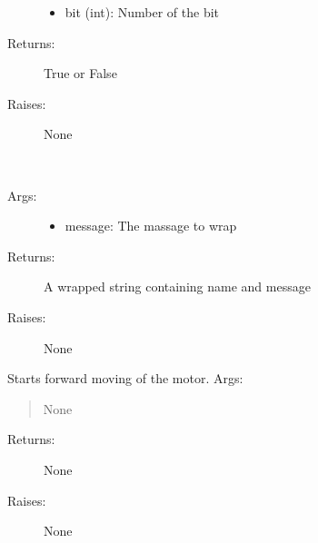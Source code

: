 \documentclass[letterpaper,10pt,english]{sphinxmanual}
\begin{document}
\begin{fulllineitems}
\begin{fulllineitems}
\begin{description}
\begin{itemize}
\item {} 
bit (int): Number of the bit

\end{itemize}

\item[{Returns:}] \leavevmode
True or False

\item[{Raises:}] \leavevmode
None

\end{description}

\end{fulllineitems}


\begin{fulllineitems}
\label{stepperMotor:stepperMotor.StepperMotor.getStatus}~\begin{description}
\item[{Args:}] \leavevmode\begin{itemize}
\item {} 
message: The massage to wrap

\end{itemize}

\item[{Returns:}] \leavevmode
A wrapped string containing name and message

\item[{Raises:}] \leavevmode
None

\end{description}

\end{fulllineitems}


\begin{fulllineitems}
\label{stepperMotor:stepperMotor.StepperMotor.goForward}
Starts forward moving of the motor.
Args:
\begin{quote}

None
\end{quote}
\begin{description}
\item[{Returns:}] \leavevmode
None

\item[{Raises:}] \leavevmode
None

\end{description}


\end{fulllineitems}
\end{fulllineitems}
\end{document}
